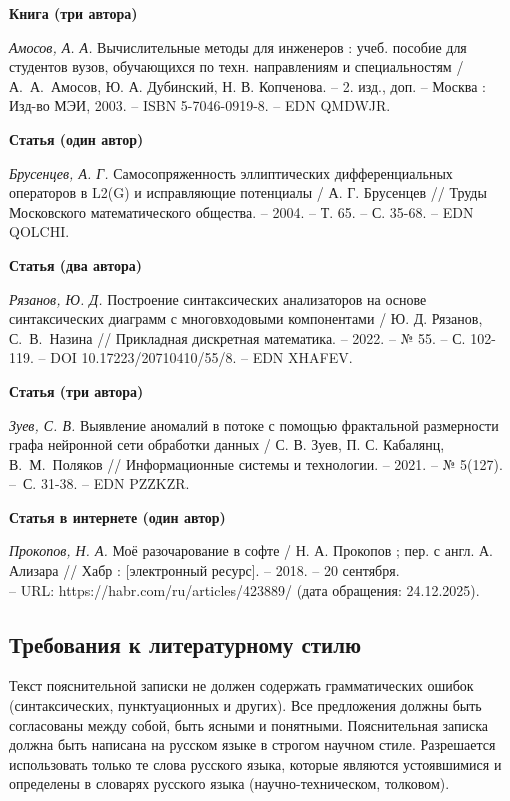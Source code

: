 \documentclass[14pt]{extarticle}
\begin{document}
\textbf{Книга (три автора)}\par
\textit{Амосов, А. А.} Вычислительные методы для инженеров : учеб. пособие для студентов вузов, обучающихся по техн. направлениям и специальностям / А.~А.~Амосов, Ю. А. Дубинский, Н. В. Копченова. -- 2. изд., доп. -- Москва : Изд-во МЭИ, 2003. -- ISBN 5-7046-0919-8. -- EDN QMDWJR.

\textbf{Статья (один автор)}\par
\textit{Брусенцев, А. Г.} Самосопряженность эллиптических дифференциальных операторов в L2(G) и исправляющие потенциалы / А. Г. Брусенцев // Труды Московского математического общества. -- 2004. -- Т. 65. -- С. 35-68. -- EDN QOLCHI.

\textbf{Статья (два автора)}\par
\textit{Рязанов, Ю. Д.} Построение синтаксических анализаторов на основе синтаксических диаграмм с многовходовыми компонентами / Ю. Д. Рязанов, С.~В.~Назина // Прикладная дискретная математика. -- 2022. -- № 55. -- С. 102-119. -- DOI 10.17223/20710410/55/8. – EDN XHAFEV.

\textbf{Статья (три автора)}\par
\textit{Зуев, С. В.} Выявление аномалий в потоке с помощью фрактальной размерности графа нейронной сети обработки данных / С. В. Зуев, П. С. Кабалянц, В.~М.~Поляков // Информационные системы и технологии. -- 2021. -- № 5(127). --~С. 31-38. -- EDN PZZKZR.

\textbf{Статья в интернете (один автор)}\par
\textit{Прокопов, Н. А.} Моё разочарование в софте / Н. А. Прокопов ; пер. с англ. А. Ализара // Хабр : [электронный ресурс]. -- 2018. -- 20 сентября. \\ -- URL: https://habr.com/ru/articles/423889/ (дата обращения: 24.12.2025).

\subsection{Требования к литературному стилю}

Текст пояснительной записки не должен содержать грамматических ошибок (синтаксических, пунктуационных и других). Все предложения должны быть согласованы между собой, быть ясными и понятными. Пояснительная записка должна быть написана на русском языке в строгом научном стиле. Разрешается использовать только те слова русского языка, которые являются устоявшимися и определены в словарях русского языка (научно-техническом, толковом).
\end{document}
